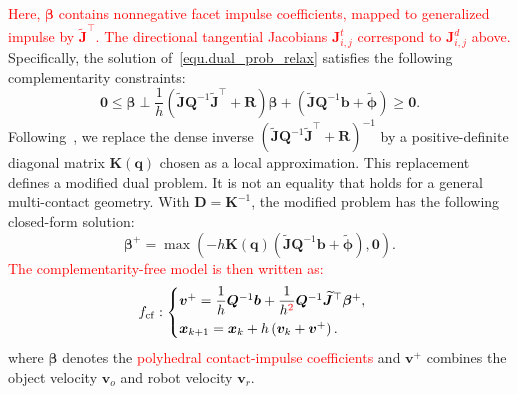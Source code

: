 \noindent\textcolor{red}{Here, $\boldsymbol{\beta}$ contains nonnegative facet impulse coefficients, mapped to generalized impulse by $\boldsymbol{\widetilde{J}}^{\top}$. The directional tangential Jacobians $\boldsymbol{J}_{i,j}^{t}$ correspond to $\boldsymbol{J}_{i,j}^{d}$ above.}
Specifically, the solution of~\eqref{equ.dual_prob_relax} satisfies the following complementarity constraints:
\begin{equation}
\label{equ.dual_prob_relax_sol}
 \boldsymbol{0}
 \leq
 \boldsymbol{\beta}
 \perp
 \frac{1}{h}
 \left(
 \boldsymbol{\widetilde{J}}
 \boldsymbol{Q}^{-1}
 \boldsymbol{\widetilde{J}}^{\top}
 +
 \boldsymbol{R}
 \right)
 \boldsymbol{\beta}
 +
 \left(
 \boldsymbol{\widetilde{J}}
 \boldsymbol{Q}^{-1}
 \boldsymbol{b}
 +
 \boldsymbol{\widetilde{\phi}}
 \right)
 \geq
 \boldsymbol{0}.
\end{equation}
\noindent Following~\cite{jin2024complementarity}, we replace the dense inverse
$(\boldsymbol{\widetilde{J}}\boldsymbol{Q}^{-1}
\boldsymbol{\widetilde{J}}^{\top}+\boldsymbol{R})^{-1}$ by a
positive-definite diagonal matrix $\boldsymbol{K}(\boldsymbol{q})$ chosen
as a local approximation. This replacement defines a modified dual
problem. It is not an equality that holds for a general multi-contact
geometry. With $\boldsymbol{D}=\boldsymbol{K}^{-1}$, the modified
problem has the following closed-form solution:
\begin{equation}
 \boldsymbol{\beta}^{+}
 =
 \max
 \left(
 -h
 \boldsymbol{K}(\boldsymbol{q})
 \left(
 \boldsymbol{\widetilde{J}}
 \boldsymbol{Q}^{-1}
 \boldsymbol{b}
 +
 \boldsymbol{\widetilde{\phi}}
 \right),
 \boldsymbol{0}
 \right).
 \label{eq:cf_impulse}
\end{equation}
\noindent\textcolor{red}{The complementarity-free model is then written as:}
\begin{equation}
\label{equ:cf_model}
f_{\mathrm{cf}}:
\begin{cases}
 \boldsymbol{v}^{+}
 =
 \dfrac{1}{h}
 \boldsymbol{Q}^{-1}
 \boldsymbol{b}
 +
 \dfrac{1}{h\textcolor{red}{^{2}}}
 \boldsymbol{Q}^{-1}
 \boldsymbol{\widetilde{J}}^{\top}
 \boldsymbol{\beta}^{+},
 \\[2mm]
 \boldsymbol{x}_{k+1}
 =
 \boldsymbol{x}_{k}
 +
 h
 \left(
 \boldsymbol{v}_{k}
 +
 \boldsymbol{v}^{+}
 \right).
\end{cases}
\end{equation}
\noindent where $\boldsymbol{\beta}$ denotes the \textcolor{red}{polyhedral contact-impulse coefficients} and $\boldsymbol{v}^{+}$ combines the object velocity $\boldsymbol{v}_o$ and robot velocity $\boldsymbol{v}_r$.
